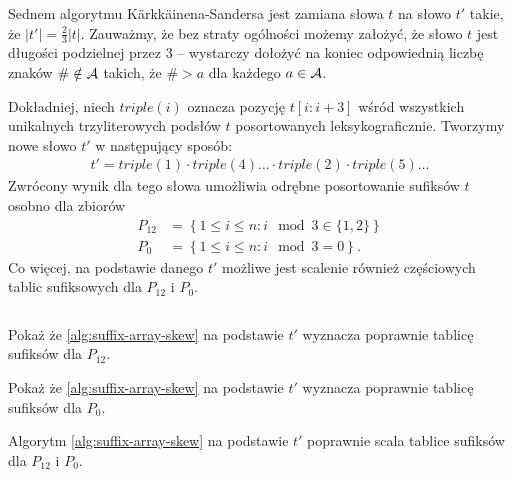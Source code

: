 Sednem algorytmu K\"arkk\"ainena-Sandersa jest zamiana słowa $t$ na słowo $t'$ takie, że $|t'| = \frac{2}{3} |t|$.
Zauważmy, że bez straty ogólności możemy założyć, że słowo $t$ jest długości podzielnej przez $3$ -- wystarczy dołożyć na koniec odpowiednią liczbę znaków $\# \notin \operatorname{\mathcal{A}}$ takich, że $\# > a$ dla każdego $a \in \operatorname{\mathcal{A}}$.

Dokładniej, niech $triple(i)$ oznacza pozycję $t[i:i+3]$ wśród wszystkich unikalnych trzyliterowych podsłów $t$ posortowanych leksykograficznie.
Tworzymy nowe słowo $t'$ w następujący sposób:
\begin{align*}
  t' = triple(1) \cdot triple(4) \ldots \cdot triple(2) \cdot triple(5) \ldots
\end{align*}
Zwrócony wynik dla tego słowa umożliwia odrębne posortowanie sufiksów $t$ osobno dla zbiorów
\begin{align*}
  P_{12} & = \left\{1 \le i \le n: i \mod 3 \in \{1, 2\}\right\} \\
  P_0 & = \left\{1 \le i \le n: i \mod 3 = 0\right\}.
\end{align*}
Co więcej, na podstawie danego $t'$ możliwe jest scalenie również częściowych tablic sufiksowych dla $P_{12}$ i $P_0$.

\begin{code}
\inputminted{python}{code/suffix-array/skew.py}
\label{alg:suffix-array-skew}
\end{code}

\begin{problem}{}{}
  Pokaż że \ref{alg:suffix-array-skew} na podstawie $t'$ wyznacza poprawnie tablicę sufiksów dla $P_{12}$.
\end{problem}

\begin{problem}{}{}
  Pokaż że \ref{alg:suffix-array-skew} na podstawie $t'$ wyznacza poprawnie tablicę sufiksów dla $P_0$.
\end{problem}

\begin{theorem}{}{}
  Algorytm \ref{alg:suffix-array-skew} na podstawie $t'$ poprawnie scala tablice sufiksów dla $P_{12}$ i $P_0$.
\end{theorem}

